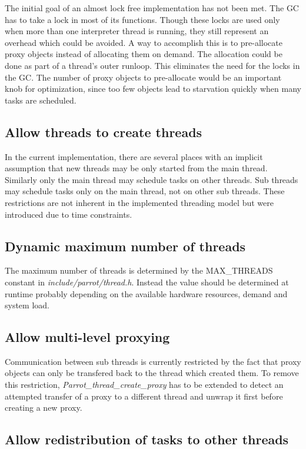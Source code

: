 \documentclass[bachelor,english]{hgbthesis}
\begin{document}
The initial goal of an almost lock free implementation has not been met. The GC has to take a lock in most of its functions. Though these locks are used only when more than one interpreter thread is running, they still represent an overhead which could be avoided. A way to accomplish this is to pre-allocate proxy objects instead of allocating them on demand. The allocation could be done as part of a thread's outer runloop. This eliminates the need for the locks in the GC. The number of proxy objects to pre-allocate would be an important knob for optimization, since too few objects lead to starvation quickly when many tasks are scheduled.

\subsection{Allow threads to create threads}

In the current implementation, there are several places with an implicit assumption that new threads may be only started from the main thread. Similarly only the main thread may schedule tasks on other threads. Sub threads may schedule tasks only on the main thread, not on other sub threads. These restrictions are not inherent in the implemented threading model but were introduced due to time constraints.

\subsection{Dynamic maximum number of threads}

The maximum number of threads is determined by the MAX\_THREADS constant in \textit{include/parrot/thread.h}. Instead the value should be determined at runtime probably depending on the available hardware resources, demand and system load.

\subsection{Allow multi-level proxying}

Communication between sub threads is currently restricted by the fact that proxy objects can only be transfered back to the thread which created them. To remove this restriction, \textit{Parrot\_thread\_create\_proxy} has to be extended to detect an attempted transfer of a proxy to a different thread and unwrap it first before creating a new proxy.

\subsection{Allow redistribution of tasks to other threads}
\end{document}
